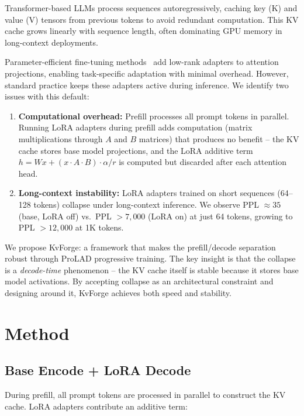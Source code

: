 \documentclass[11pt]{article}
\begin{document}
Transformer-based LLMs process sequences autoregressively, caching key (K) and value (V) tensors from previous tokens to avoid redundant computation. This KV cache grows linearly with sequence length, often dominating GPU memory in long-context deployments.

Parameter-efficient fine-tuning methods~\cite{lora} add low-rank adapters to attention projections, enabling task-specific adaptation with minimal overhead. However, standard practice keeps these adapters active during inference. We identify two issues with this default:

\begin{enumerate}
    \item \textbf{Computational overhead:} Prefill processes all prompt tokens in parallel. Running LoRA adapters during prefill adds computation (matrix multiplications through $A$ and $B$ matrices) that produces no benefit -- the KV cache stores base model projections, and the LoRA additive term $h = Wx + (x \cdot A \cdot B) \cdot \alpha/r$ is computed but discarded after each attention head.
    \item \textbf{Long-context instability:} LoRA adapters trained on short sequences (64--128 tokens) collapse under long-context inference. We observe PPL $\approx 35$ (base, LoRA off) vs.~PPL $> 7{,}000$ (LoRA on) at just 64 tokens, growing to PPL $> 12{,}000$ at 1K tokens.
\end{enumerate}

We propose KvForge: a framework that makes the prefill/decode separation robust through ProLAD progressive training. The key insight is that the collapse is a \emph{decode-time} phenomenon -- the KV cache itself is stable because it stores base model activations. By accepting collapse as an architectural constraint and designing around it, KvForge achieves both speed and stability.

\section{Method}
\label{sec:method}

\subsection{Base Encode + LoRA Decode}
\label{sec:base-encode}

During prefill, all prompt tokens are processed in parallel to construct the KV cache. LoRA adapters contribute an additive term:
\end{document}
